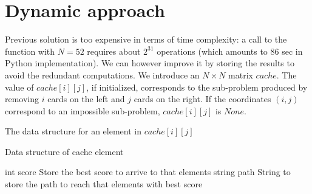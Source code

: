 \documentclass{article}
\begin{document}
\section{Dynamic approach}


Previous solution is too expensive in terms of time complexity: a call to the function with $N=52$ requires about $2^{31}$ operations (which amounts to 86 sec in Python implementation). We can however improve it by storing the results to avoid the redundant computations. We introduce an $N\times N$ matrix $cache$. The value of $cache[i][j]$, if initialized, corresponds to the sub-problem produced by removing $i$ cards on the left and $j$ cards on the right. If the coordinates $(i,j)$ correspond to an impossible sub-problem, $cache[i][j]$ is $None$.

The data structure for an element in $cache[i][j]$
\begin{algorithm}[H]
\begin{algorithmic}
\caption{Data structure of cache element}
\State int score \Comment Store the best score to arrive to that elements
\State string path \Comment String to store the path to reach that elements with best score
\end{algorithmic}
\end{algorithm}
\end{document}
